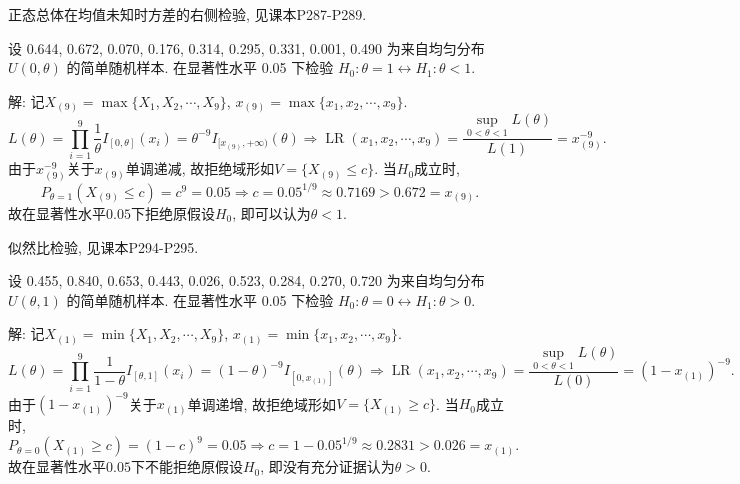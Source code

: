 \documentclass[standard]{ExBook}
\renewenvironment{shaded}{%
  \def\FrameCommand{\fboxsep=\FrameSep \colorbox{shadecolor}}%
  \MakeFramed{\advance\hsize-\width \FrameRestore}%
}{%
  \endMakeFramed
}
\begin{document}
\begin{qitems}
\textcolor{themeColor}{\selectfont {} 正态总体在均值未知时方差的右侧检验, 见课本P287-P289.}

\vspace{2.5cm-5em}

    \begin{bbox}
    \begin{shaded}
        \qitem
设 0.644, 0.672, 0.070, 0.176, 0.314, 0.295, 0.331, 0.001, 0.490 为来自均匀分布 $U(0,\theta)$ 的简单随机样本. 在显著性水平 0.05 下检验 $H_0 : \theta=1 \longleftrightarrow H_1 : \theta<1$.
    \end{shaded}
    \end{bbox}

\vspace{\dimexpr2.5cm-5em\relax}

解: 记$X_{(9)}=\max\{X_1,X_2,\cdots,X_9\}$, $x_{(9)}=\max\{x_1,x_2,\cdots,x_9\}$.
$$
L(\theta)
=\prod_{i=1}^{9}\frac{1}{\theta}I_{[0,\theta]}(x_i)
=\theta^{-9}I_{[x_{(9)},+\infty)}(\theta)
\Longrightarrow
\operatorname{LR}(x_1,x_2,\cdots,x_9)
=
\frac{\sup\limits_{0<\theta<1}L(\theta)}{L(1)}
=
x_{(9)}^{-9}.
$$
由于$x_{(9)}^{-9}$关于$x_{(9)}$单调递减, 故拒绝域形如$V=\{X_{(9)}\leq c\}$. 当$H_0$成立时,
$$
P_{\theta=1}(X_{(9)}\leq c)
=c^9
=0.05
\Longrightarrow
c=0.05^{1/9}
\approx0.7169
>0.672=x_{(9)}.
$$
故在显著性水平$0.05$下拒绝原假设$H_0$, 即可以认为$\theta<1$.

\textcolor{themeColor}{\selectfont {} 似然比检验, 见课本P294-P295.}

\vspace{2.5cm-5em}

    \begin{bbox}
    \begin{shaded}
        \qitem
设 0.455, 0.840, 0.653, 0.443, 0.026, 0.523, 0.284, 0.270, 0.720 为来自均匀分布 $U(\theta,1)$ 的简单随机样本. 在显著性水平 0.05 下检验 $H_0 : \theta=0 \longleftrightarrow H_1 : \theta > 0$.
    \end{shaded}
    \end{bbox}

\vspace{\dimexpr2.5cm-5em\relax}

解: 记$X_{(1)}=\min\{X_1,X_2,\cdots,X_9\}$, $x_{(1)}=\min\{x_1,x_2,\cdots,x_9\}$.
$$
L(\theta)
=\prod_{i=1}^{9}\frac{1}{1-\theta}I_{[\theta,1]}(x_i)
=(1-\theta)^{-9}I_{[0,x_{(1)}]}(\theta)
\Longrightarrow
\operatorname{LR}(x_1,x_2,\cdots,x_9)
=
\frac{\sup\limits_{0<\theta<1}L(\theta)}{L(0)}
=
(1-x_{(1)})^{-9}.
$$
由于$(1-x_{(1)})^{-9}$关于$x_{(1)}$单调递增, 故拒绝域形如$V=\{X_{(1)}\geq c\}$. 当$H_0$成立时,
$$
P_{\theta=0}(X_{(1)}\geq c)
=(1-c)^9
=0.05
\Longrightarrow
c=1-0.05^{1/9}
\approx0.2831
>0.026=x_{(1)}.
$$
故在显著性水平$0.05$下不能拒绝原假设$H_0$, 即没有充分证据认为$\theta>0$.


\end{qitems}
\end{document}

